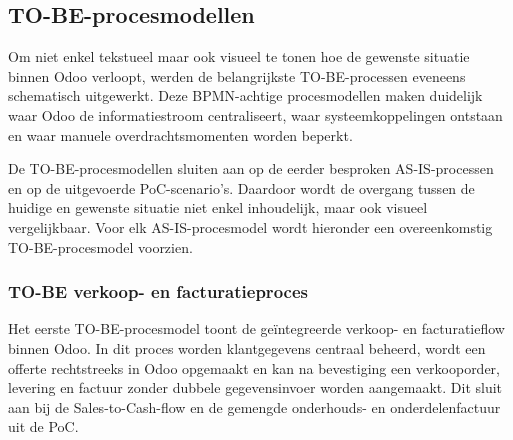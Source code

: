 \subsection{TO-BE-procesmodellen}

Om niet enkel tekstueel maar ook visueel te tonen hoe de gewenste situatie binnen Odoo verloopt, werden de belangrijkste TO-BE-processen eveneens schematisch uitgewerkt. Deze BPMN-achtige procesmodellen maken duidelijk waar Odoo de informatiestroom centraliseert, waar systeemkoppelingen ontstaan en waar manuele overdrachtsmomenten worden beperkt.

De TO-BE-procesmodellen sluiten aan op de eerder besproken AS-IS-processen en op de uitgevoerde PoC-scenario's. Daardoor wordt de overgang tussen de huidige en gewenste situatie niet enkel inhoudelijk, maar ook visueel vergelijkbaar. Voor elk AS-IS-procesmodel wordt hieronder een overeenkomstig TO-BE-procesmodel voorzien.

\subsubsection{TO-BE verkoop- en facturatieproces}

Het eerste TO-BE-procesmodel toont de geïntegreerde verkoop- en facturatieflow binnen Odoo. In dit proces worden klantgegevens centraal beheerd, wordt een offerte rechtstreeks in Odoo opgemaakt en kan na bevestiging een verkooporder, levering en factuur zonder dubbele gegevensinvoer worden aangemaakt. Dit sluit aan bij de Sales-to-Cash-flow en de gemengde onderhouds- en onderdelenfactuur uit de PoC.

